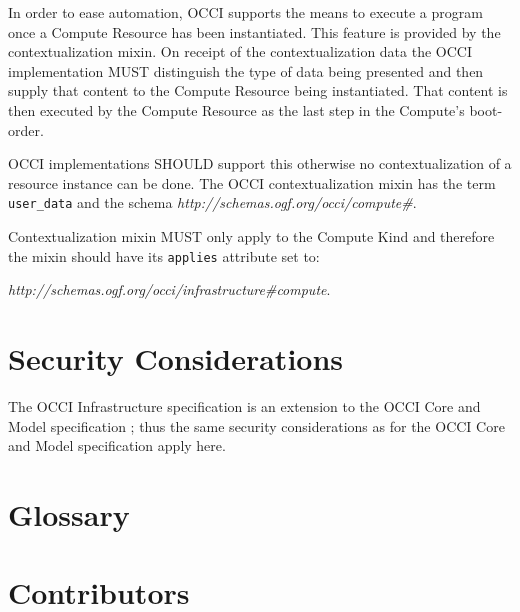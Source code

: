 \documentclass[10pt,a4paper]{article}
\begin{document}
In order to ease automation, OCCI supports the means to execute a
program once a Compute Resource has been instantiated. This feature is
provided by the contextualization mixin. On receipt of the
contextualization data the OCCI implementation MUST distinguish
the type of data being presented and then supply that content to the
Compute Resource being instantiated. That content is then executed
by the Compute Resource as the last step in the Compute's boot-order.

OCCI implementations SHOULD support this otherwise no
contextualization of a resource instance can be done.
The OCCI contextualization mixin has the term \texttt{user\_data}
and the schema \textit{http://schemas.ogf.org/occi/compute\#}.

Contextualization mixin MUST only apply to the Compute Kind and therefore
the mixin should have its \texttt{applies} attribute set to:

\textit{http://schemas.ogf.org/occi/infrastructure\#compute}.



\section{Security Considerations}
The OCCI Infrastructure specification is an extension to the OCCI Core
and Model specification \cite{occi:core}; thus the same security
considerations as for the OCCI Core and Model specification apply
here.

\section{Glossary}
\label{sec:glossary}


\section{Contributors}

\end{document}
